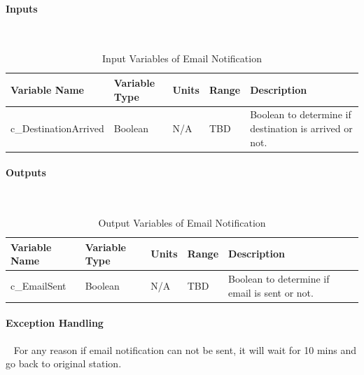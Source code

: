 \documentclass[12pt]{article}
\begin{document}
            \paragraph{Inputs}
            ~\newline
                \begin{table}[H]
                  \centering
                    \caption{Input Variables of Email Notification} 
                    \label{tbl:Input Variables of Email Notification}
                  \begin{tabularx}{\textwidth}{|p{5cm}|p{2cm}|p{1.2cm}|p{1cm}|X|}
                    \hline Variable Name & Variable Type & Units & Range & Description \\
                    \hline c\_DestinationArrived & Boolean &  N/A & TBD & Boolean to determine if destination is arrived or not.\\
                    \hline
                  \end{tabularx}
                \end{table} 
                
            \paragraph{Outputs}
            ~\newline
                \begin{table}[H]
                  \centering
                    \caption{Output Variables of Email Notification} \label{tbl:Output Variables of Email Notification}
                  \begin{tabularx}{\textwidth}{|p{5cm}|p{2cm}|p{1.2cm}|p{1cm}|X|}
                    \hline Variable Name & Variable Type & Units & Range & Description \\
                    \hline c\_EmailSent & Boolean &  N/A & TBD & Boolean to determine if email is sent or not.\\
                    \hline
                  \end{tabularx}
                \end{table} 
                
            \paragraph{Exception Handling}
            ~\newline
            For any reason if email notification can not be sent, it will wait for 10 mins and go back to original station. \\
            
\end{document}
